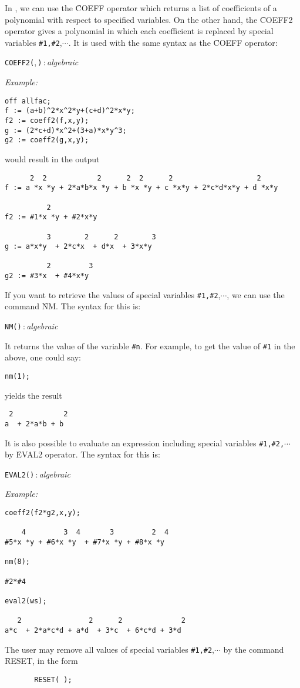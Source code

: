 In \REDUCE,  we can use the \f{COEFF} operator which returns a list of coefficients of a polynomial
with respect to  specified variables. 
On the other hand, the \f{COEFF2} operator gives a polynomial in which each coefficient is replaced by
special variables \verb|#1,#2|,$\cdots$. It is used with the same syntax as the \f{COEFF} operator:
\begin{syntax}
  \texttt{COEFF2(},\,\texttt{)}\,:\,\textit{algebraic}
\end{syntax}
\textit{Example:}
\begin{verbatim}
off allfac;
f := (a+b)^2*x^2*y+(c+d)^2*x*y;
f2 := coeff2(f,x,y);
g := (2*c+d)*x^2+(3+a)*x*y^3;
g2 := coeff2(g,x,y);
\end{verbatim}
would result in the output
\begin{verbatim}
      2  2            2      2  2      2                    2
f := a *x *y + 2*a*b*x *y + b *x *y + c *x*y + 2*c*d*x*y + d *x*y

          2
f2 := #1*x *y + #2*x*y

          3        2      2        3
g := a*x*y  + 2*c*x  + d*x  + 3*x*y

          2         3
g2 := #3*x  + #4*x*y
\end{verbatim}
If you want to retrieve the values of  special variables \verb|#1,#2|,$\cdots$,
we can use the command \f{NM}. The syntax for this is:
\begin{syntax}
  \texttt{NM(}\texttt{)}\,:\,\textit{algebraic}
\end{syntax}
It returns the value of the variable \verb|#n|. For example, to get the value of 
\verb|#1| in the above, one could say:
\begin{verbatim}
nm(1);
\end{verbatim}
yields the result
\begin{verbatim}
 2            2
a  + 2*a*b + b
\end{verbatim}
It is also possible to evaluate an expression including  special variables \verb|#1,#2,|$\cdots$
by \f{EVAL2} operator.
The syntax for this is:
\begin{syntax}
  \texttt{EVAL2(}\texttt{)}\,:\,\textit{algebraic}
\end{syntax}
\textit{Example:}
\begin{verbatim}
coeff2(f2*g2,x,y);

    4         3  4       3         2  4
#5*x *y + #6*x *y  + #7*x *y + #8*x *y

nm(8);

#2*#4

eval2(ws);

   2                2      2              2
a*c  + 2*a*c*d + a*d  + 3*c  + 6*c*d + 3*d

\end{verbatim}
The user may remove all values of special variables \verb|#1,#2|,$\cdots$
by the command \f{RESET}, in the form
\begin{verbatim}
       RESET( );
\end{verbatim}

